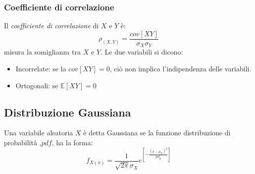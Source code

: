         \subsubsection{Coefficiente di correlazione}
            Il \emph{coefficiente di correlazione} di $X$ e $Y$ è:
            \[
                \rho_{(X,Y)} = \frac{cov[XY]}{\sigma_X\sigma_Y}
            \]
            misura la somiglianza tra $X$ e $Y$. Le due variabili si dicono:
            \begin{itemize}
                \item {
                    Incorrelate: se la $cov[XY] =0$, ciò non implica l'indipendenza delle variabili.
                }
                \item {
                    Ortogonali: se $\mathbb{E}[XY] = 0$
                }
            \end{itemize}
    \subsection{Distribuzione Gaussiana}
        Una variabile aleatoria $X$ è detta Gaussiana se la funzione distribuzione di probabilità ,$pdf$, ha la forma:
        \[
            f_{X(x)} = \frac{1}{\sqrt{2\pi}\sigma_X}e^{\left[\displaystyle -\frac{(x-\mu_X)^2}{2\sigma^2_X}\right]}  
        \]
